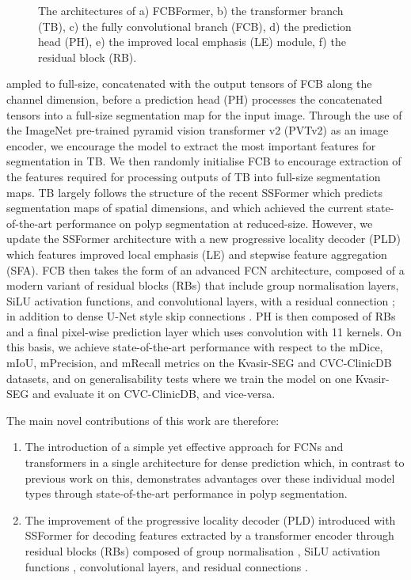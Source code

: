 \documentclass[runningheads]{llncs}
\begin{document}
\begin{figure}[H]
\caption{The architectures of a) FCBFormer, b) the transformer branch (TB), c) the fully convolutional branch (FCB), d) the prediction head (PH), e) the improved local emphasis (LE) module, f) the residual block (RB).} \label{fig:FCBformer}
\end{figure}

\noindent ampled to full-size, concatenated with the output tensors of FCB along the channel dimension, before a prediction head (PH) processes the concatenated tensors into a full-size segmentation map for the input image. Through the use  of the ImageNet \cite{imagenet} pre-trained pyramid vision transformer v2 (PVTv2) \cite{pvtv2} as an image encoder, we encourage the model to extract the most important features for segmentation in TB. We then randomly initialise FCB to encourage extraction of the features required for processing outputs of TB into full-size segmentation maps. TB largely follows the structure of the recent SSFormer \cite{ssformer} which predicts segmentation maps of  spatial dimensions, and which achieved the current state-of-the-art performance on polyp segmentation at reduced-size. However, we update the SSFormer architecture with a new progressive locality decoder (PLD) which features improved local emphasis (LE) and stepwise feature aggregation (SFA). FCB then takes the form of an advanced FCN architecture, composed of a modern variant of residual blocks (RBs) that include group normalisation \cite{groupnorm} layers, SiLU \cite{gelu} activation functions, and convolutional layers, with a residual connection \cite{resnet,highwaynets}; in addition to dense U-Net style skip connections \cite{unet}. PH is then composed of RBs and a final pixel-wise prediction layer which uses convolution with 11 kernels. On this basis, we achieve state-of-the-art performance with respect to the mDice, mIoU, mPrecision, and mRecall metrics on the Kvasir-SEG \cite{kvasir} and CVC-ClinicDB \cite{cvc} datasets, and on generalisability tests where we train the model on one Kvasir-SEG and evaluate it on CVC-ClinicDB, and vice-versa.

The main novel contributions of this work are therefore:
\begin{enumerate}
\item The introduction of a simple yet effective approach for FCNs and transformers in a single architecture for dense prediction which, in contrast to previous work on this, demonstrates advantages over these individual model types through state-of-the-art performance in polyp segmentation.
\item The improvement of the progressive locality decoder (PLD) introduced with SSFormer \cite{ssformer} for decoding features extracted by a transformer encoder through residual blocks (RBs) composed of group normalisation \cite{groupnorm}, SiLU activation functions \cite{groupnorm}, convolutional layers, and residual connections \cite{resnet}.
\end{enumerate}
\end{document}
